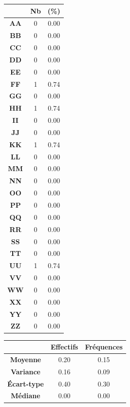 \documentclass[a4paper, titlepage]{livret}
\begin{document}
\begin{center}
\begin{minipage}[c]{.3\linewidth}
 \begin{tabular}{|c|c|c|}
 \hline
	& \textbf{Nb} & \textbf{(\%)}\\
	\hline
	\textbf{AA} &       0 &  0.00\\
	\hline
	\textbf{BB} &       0 &  0.00\\
	\hline
	\textbf{CC} &       0 &  0.00\\
	\hline
	\textbf{DD} &       0 &  0.00\\
	\hline
	\textbf{EE} &       0 &  0.00\\
	\hline
	\textbf{FF} &       1 &  0.74\\
	\hline
	\textbf{GG} &       0 &  0.00\\
	\hline
	\textbf{HH} &       1 &  0.74\\
	\hline
	\textbf{II} &       0 &  0.00\\
	\hline
	\textbf{JJ} &       0 &  0.00\\
	\hline
	\textbf{KK} &       1 &  0.74\\
	\hline
	\textbf{LL} &       0 &  0.00\\
	\hline
	\textbf{MM} &       0 &  0.00\\
	\hline
	\textbf{NN} &       0 &  0.00\\
	\hline
	\textbf{OO} &       0 &  0.00\\
	\hline
	\textbf{PP} &       0 &  0.00\\
	\hline
	\textbf{QQ} &       0 &  0.00\\
	\hline
	\textbf{RR} &       0 &  0.00\\
	\hline
	\textbf{SS} &       0 &  0.00\\
	\hline
	\textbf{TT} &       0 &  0.00\\
	\hline
	\textbf{UU} &       1 &  0.74\\
	\hline
	\textbf{VV} &       0 &  0.00\\
	\hline
	\textbf{WW} &       0 &  0.00\\
	\hline
	\textbf{XX} &       0 &  0.00\\
	\hline
	\textbf{YY} &       0 &  0.00\\
	\hline
	\textbf{ZZ} &       0 &  0.00\\
	\hline
\end{tabular}
  \label{tab29}
\end{minipage}
\end{center}

\begin{center}
\begin{tabular}{|c|c|c|}
	\hline
	& \textbf{Effectifs} & \textbf{Fréquences}\\
	\hline
	\textbf{Moyenne} &    0.20 &  0.15\\
	\hline
	\textbf{Variance} &    0.16 &  0.09\\
	\hline
	\textbf{Écart-type} &    0.40 &  0.30\\
	\hline
	\textbf{Médiane} &    0.00 &  0.00\\
	\hline
\end{tabular}
\label{tab187}
\end{center}
\end{document}
